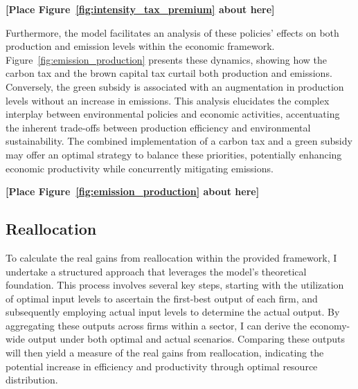 \bigskip
\centerline{\bf [Place Figure~\ref{fig:intensity_tax_premium} about here]}

Furthermore, the model facilitates an analysis of these policies' effects on both production and emission levels within the economic framework. Figure~\ref{fig:emission_production} presents these dynamics, showing how the carbon tax and the brown capital tax curtail both production and emissions. Conversely, the green subsidy is associated with an augmentation in production levels without an increase in emissions. This analysis elucidates the complex interplay between environmental policies and economic activities, accentuating the inherent trade-offs between production efficiency and environmental sustainability. The combined implementation of a carbon tax and a green subsidy may offer an optimal strategy to balance these priorities, potentially enhancing economic productivity while concurrently mitigating emissions.

\bigskip
\centerline{\bf [Place Figure~\ref{fig:emission_production} about here]}

\subsection{Reallocation} \label{sec:reallocation}

To calculate the real gains from reallocation within the provided framework, I undertake a structured approach that leverages the model's theoretical foundation. This process involves several key steps, starting with the utilization of optimal input levels to ascertain the first-best output of each firm, and subsequently employing actual input levels to determine the actual output. By aggregating these outputs across firms within a sector, I can derive the economy-wide output under both optimal and actual scenarios. Comparing these outputs will then yield a measure of the real gains from reallocation, indicating the potential increase in efficiency and productivity through optimal resource distribution.

